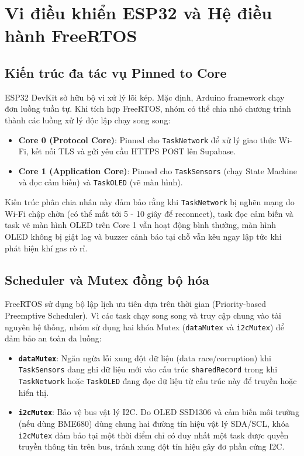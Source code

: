 \section{Vi điều khiển ESP32 và Hệ điều hành FreeRTOS}
\subsection{Kiến trúc đa tác vụ Pinned to Core}
ESP32 DevKit sở hữu bộ vi xử lý lõi kép. Mặc định, Arduino framework chạy đơn luồng tuần tự. Khi tích hợp FreeRTOS, nhóm có thể chia nhỏ chương trình thành các luồng xử lý độc lập chạy song song:
\begin{itemize}
    \item \textbf{Core 0 (Protocol Core)}: Pinned cho \texttt{TaskNetwork} để xử lý giao thức Wi-Fi, kết nối TLS và gửi yêu cầu HTTPS POST lên Supabase.
    \item \textbf{Core 1 (Application Core)}: Pinned cho \texttt{TaskSensors} (chạy State Machine và đọc cảm biến) và \texttt{TaskOLED} (vẽ màn hình).
\end{itemize}

Kiến trúc phân chia nhân này đảm bảo rằng khi \texttt{TaskNetwork} bị nghẽn mạng do Wi-Fi chập chờn (có thể mất tới 5 - 10 giây để reconnect), task đọc cảm biến và task vẽ màn hình OLED trên Core 1 vẫn hoạt động bình thường, màn hình OLED không bị giật lag và buzzer cảnh báo tại chỗ vẫn kêu ngay lập tức khi phát hiện khí gas rò rỉ.

\subsection{Scheduler và Mutex đồng bộ hóa}
FreeRTOS sử dụng bộ lập lịch ưu tiên dựa trên thời gian (Priority-based Preemptive Scheduler). Vì các task chạy song song và truy cập chung vào tài nguyên hệ thống, nhóm sử dụng hai khóa Mutex (\texttt{dataMutex} và \texttt{i2cMutex}) để đảm bảo an toàn đa luồng:
\begin{itemize}
    \item \textbf{\texttt{dataMutex}}: Ngăn ngừa lỗi xung đột dữ liệu (data race/corruption) khi \texttt{TaskSensors} đang ghi dữ liệu mới vào cấu trúc \texttt{sharedRecord} trong khi \texttt{TaskNetwork} hoặc \texttt{TaskOLED} đang đọc dữ liệu từ cấu trúc này để truyền hoặc hiển thị.
    \item \textbf{\texttt{i2cMutex}}: Bảo vệ bus vật lý I2C. Do OLED SSD1306 và cảm biến môi trường (nếu dùng BME680) dùng chung hai đường tín hiệu vật lý SDA/SCL, khóa \texttt{i2cMutex} đảm bảo tại một thời điểm chỉ có duy nhất một task được quyền truyền thông tin trên bus, tránh xung đột tín hiệu gây đơ phần cứng I2C.
\end{itemize}

